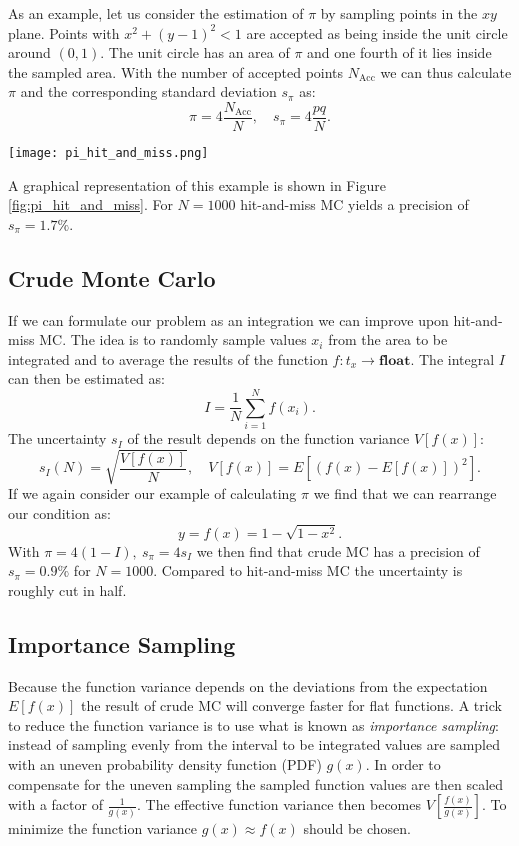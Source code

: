 As an example, let us consider the estimation of $\pi$ by sampling points in the $xy$ plane.
Points with $x^2 + (y - 1)^2 < 1$ are accepted as being inside the unit circle around $(0, 1)$.
The unit circle has an area of $\pi$ and one fourth of it lies inside the sampled area.
With the number of accepted points $N_\mathrm{Acc}$ we can thus calculate $\pi$ and the corresponding standard deviation $s_\pi$ as:
\begin{equation}
	\pi = 4 \frac{N_\mathrm{Acc}}{N}, \quad s_\pi = 4 \frac{pq}{N}.
\end{equation}
\begin{figure*}
	\centering
	\texttt{[image: pi\_hit\_and\_miss.png]}
	\caption{
		Visualization of hit-and-miss MC.
		Randomly sampled points are accepted if they are inside the circle around the upper left corner.
	}
	\label{fig:pi_hit_and_miss}
\end{figure*}
A graphical representation of this example is shown in Figure \ref{fig:pi_hit_and_miss}.
For $N = 1000$ hit-and-miss MC yields a precision of $s_\pi = 1.7\%$.
\subsection{Crude Monte Carlo}
If we can formulate our problem as an integration we can improve upon hit-and-miss MC.
The idea is to randomly sample values $x_i$ from the area to be integrated
and to average the results of the function $f : t_x \rightarrow \mathbf{float}$.
The integral $I$ can then be estimated as:
\begin{equation}
	I = \frac{1}{N} \sum_{i=1}^N f(x_i).
\end{equation}
The uncertainty $s_I$ of the result depends on the function variance $V[f(x)]$:
\begin{equation}
	s_I(N) = \sqrt{\frac{V[f(x)]}{N}}, \quad V[f(x)] = E \left[ (f(x) - E[f(x)])^2 \right].
\end{equation}
If we again consider our example of calculating $\pi$ we find that we can rearrange our condition as:
\begin{equation}
	y = f(x) = 1 - \sqrt{1 - x^2}.
\end{equation}
With $\pi = 4 (1 - I), \: s_\pi = 4 s_I$ we then find that crude MC has a precision of $s_\pi = 0.9\%$ for $N = 1000$.
Compared to hit-and-miss MC the uncertainty is roughly cut in half.
\subsection{Importance Sampling}
Because the function variance depends on the deviations from the expectation $E[f(x)]$
the result of crude MC will converge faster for flat functions.
A trick to reduce the function variance is to use what is known as \textit{importance sampling}:
instead of sampling evenly from the interval to be integrated values are
sampled with an uneven probability density function (PDF) $g(x)$.
In order to compensate for the uneven sampling the sampled function values are then scaled with a factor of $\frac{1}{g(x)}$.
The effective function variance then becomes $ V \left[ \frac{f(x)}{g(x)} \right] $.
To minimize the function variance $g(x) \approx f(x)$ should be chosen.

